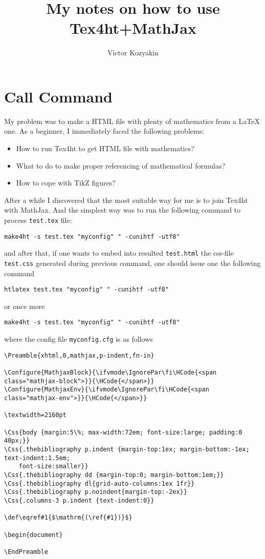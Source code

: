 \documentclass{article}
\title{My notes on how to use Tex4ht+MathJax}
\author{Victor Kozyakin}
\begin{document}
\maketitle

\section{Call Command}\label{S1}
My problem was to make a HTML file with plenty of mathematics from a \LaTeX{}
one. As a beginner, I immediately faced the following problems:
\begin{itemize}
  \item How to run Tex4ht to get HTML file with mathematics?
  \item What to do to make proper referencing of mathematical formulas?
  \item How to cope with TikZ figures?
\end{itemize}

After a while I discovered that the most suitable way for me is to join
Tex4ht with MathJax. And the simplest way was to run the following command to
process \verb|test.tex| file:

{\small
\begin{verbatim}
make4ht -s test.tex "myconfig" " -cunihtf -utf8"
\end{verbatim}}
  \noindent and after that, if one wants to embed into resulted
  \verb|test.html| the css-file \verb|test.css| generated during previous
  command, one should issue one the following command {\small
    \begin{verbatim}
htlatex test.tex "myconfig" " -cunihtf -utf8"
\end{verbatim}
    \noindent or once more
    \begin{verbatim}
make4ht -s test.tex "myconfig" " -cunihtf -utf8"
\end{verbatim}}
    \noindent where the config file \verb|myconfig.cfg| is as
    follows

    {\small
    \begin{verbatim}
\Preamble{xhtml,0,mathjax,p-indent,fn-in}

\Configure{MathjaxBlock}{\ifvmode\IgnorePar\fi\HCode{<span class="mathjax-block">}}{\HCode{</span>}}
\Configure{MathjaxEnv}{\ifvmode\IgnorePar\fi\HCode{<span class="mathjax-env">}}{\HCode{</span>}}

\textwidth=2160pt

\Css{body {margin:5\%; max-width:72em; font-size:large; padding:0 40px;}}
\Css{.thebibliography p.indent {margin-top:1ex; margin-bottom:-1ex; text-indent:1.5em;
    font-size:smaller}}
\Css{.thebibliography dd {margin-top:0; margin-bottom:1em;}}
\Css{.thebibliography dl{grid-auto-columns:1ex 1fr}}
\Css{.thebibliography p.noindent{margin-top:-2ex}}
\Css{.columns-3 p.indent {text-indent:0}}

\def\eqref#1{$\mathrm{(\ref{#1})}$}

\begin{document}

\EndPreamble
\end{verbatim}}
\end{document}
